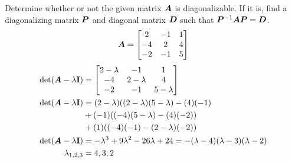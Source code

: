 \documentclass{article}
\begin{document}
Determine whether or not the given matrix $ \bm{A} $ is diagonalizable. If it is, find a diagonalizing matrix $ \bm{P} $ and diagonal matrix $ \bm{D} $ such that $ \bm{P}^{-1}\bm{A}\bm{P} = \bm{D} $.
\begin{equation*}
	\bm{A} =
		\begin{bmatrix}
			2 & -1 & 1 \\
			-4 & 2 & 4 \\
			-2 & -1 & 5
		\end{bmatrix}
\end{equation*}
\begin{align*}
	\det( \matr{A} - \lambda \vect{I} ) & =
		\begin{bmatrix}
			2 - \lambda & -1 & 1 \\
			-4 & 2 - \lambda & 4 \\
			-2 & -1 & 5 - \lambda
		\end{bmatrix} \\
	\det( \matr{A} - \lambda \vect{I} ) & = (2 - \lambda)( (2 - \lambda)(5 - \lambda)- (4)(-1) \\
										& + (-1)( (-4)(5 - \lambda) - (4)(-2) ) \\
										& + (1)( (-4)(-1) - (2 - \lambda)(-2) ) \\
	\det( \matr{A} - \lambda \vect{I} ) & =
		-\lambda^3 + 9\lambda^2 - 26\lambda + 24 = -(\lambda - 4)(\lambda - 3)(\lambda - 2) \\
	\lambda_{1,2,3} & = 4, 3, 2
\end{align*}
\end{document}
